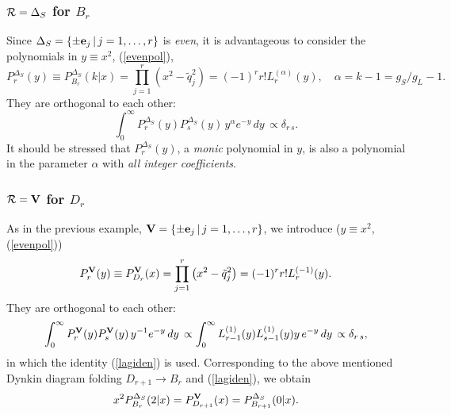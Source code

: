 \documentclass[a4paper,12pt]{article}
\begin{document}
\subsubsection{${\cal R}=\Delta_S$ for $B_r$}

Since $\Delta_S=\{\pm{\bf e}_j\,|\,j=1,\ldots,r\}$ is {\em even\/},
it is advantageous to consider the polynomials in $y\equiv x^2$,
(\ref{evenpol}),
\begin{equation}
   P_r^{\Delta_S}(y)\equiv P_{B_r}^{\Delta_S}(k|x)=
   \prod_{j=1}^{r}\left(x^2-\tilde{q}_j^2\right)
   =(-1)^rr!L_{r}^{(\alpha)}(y),\quad \alpha=k-1=g_S/g_L-1.
   \label{lagpoly}
\end{equation}
They are orthogonal to each other:
\begin{equation}
   \int_{0}^\infty P_r^{\Delta_S}(y)P_s^{\Delta_S}(y)\,y^\alpha e^{- y}\,dy\,
   \propto\delta_{r\,s}.
\end{equation}
It should be stressed that $P_r^{\Delta_S}(y)$, a {\em monic\/} polynomial
in $y$, is also a polynomial in the parameter $\alpha$ with
{\em all integer coefficients\/}.

\subsubsection{${\cal R}={\bf V}$ for $D_r$}

As in the previous example, ${\bf V}=\{\pm{\bf e}_j\,|\,j=1,\ldots,r\}$,
we introduce ($y\equiv x^2$, (\ref{evenpol}))
\begin{equation}
   P_r^{\bf V}(y)\equiv P_{D_r}^{\bf V}(x)=
   \prod_{j=1}^{r}\left(x^2-\tilde{q}_j^2\right)
   =(-1)^rr! L_{r}^{(-1)}(y).
\end{equation}
They are orthogonal to each other:
\begin{equation}
   \int_{0}^\infty P_r^{\bf V}(y)P_s^{\bf V}(y)\,y^{-1} e^{-y}\,dy\,
   \propto \int_{0}^\infty L_{r-1}^{(1)}(y)L_{s-1}^{(1)}(y)
   y\, e^{-y}\,dy\,
   \propto\delta_{r\,s},
\end{equation}
in which the identity (\ref{lagiden}) is used.
Corresponding to the above mentioned Dynkin diagram folding
$D_{r+1}\to B_r$ and (\ref{lagiden}), we obtain
\begin{equation}
   x^2P_{B_r}^{\Delta_S}(2|x)=P_{D_{r+1}}^{\bf V}(x)
   =P_{B_{r+1}}^{\Delta_S}(0|x).
   \label{drbrredV}
\end{equation}
\end{document}
